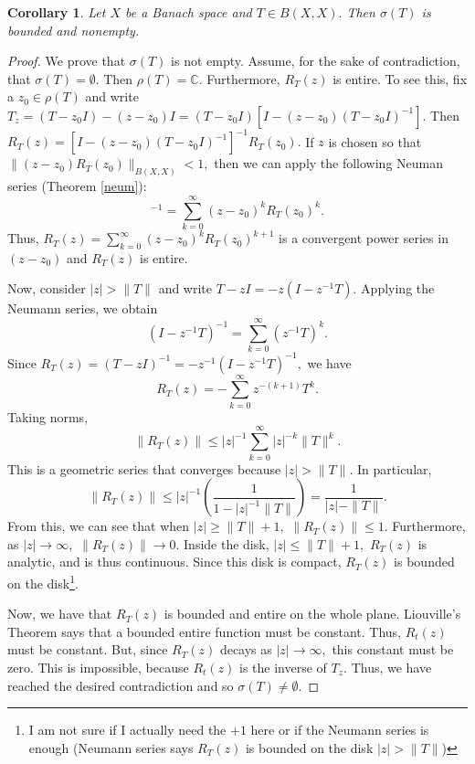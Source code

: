 \documentclass[12pt,a4paper]{article}
\theoremstyle{boldthm}
\newtheorem{corollary}[theorem]{Corollary}
\theoremstyle{bolddefn}
\begin{document}
\begin{corollary}
    Let $X$ be a Banach space and $T \in B(X, X).$ Then $\sigma(T)$ is bounded and nonempty. 
\end{corollary}
\begin{proof}
We prove that $\sigma(T)$ is not empty.
Assume, for the sake of contradiction, that $\sigma(T) = \emptyset.$ Then $\rho(T) = \mathbb{C}.$ Furthermore, $R_T(z)$ is entire. To see this, fix a $z_0 \in \rho(T)$ and write $T_z = (T-z_0 I) - (z-z_0)I = (T-z_0I) [ I - (z-z_0)(T-z_0I)^{-1}].$ Then $R_T(z) = [ I - (z-z_0)(T-z_0I)^{-1}]^{-1} R_T(z_0).$ If $z$ is chosen so that $\| (z-z_0) R_T(z_0) \|_{B(X, X)} < 1,$ then we can apply the following Neuman series (Theorem \ref{neum}):
\begin{equation}
    [ I - (z-z_0)(T-z_0I)^{-1}]^{-1} = \sum_{k=0}^{\infty} (z-z_0)^k R_T(z_0)^k.
\end{equation}
Thus, $R_T(z) = \sum_{k=0}^{\infty} (z-z_0)^k R_T(z_0)^{k+1}$ is a convergent power series in $(z-z_0)$ and $R_T(z)$ is entire. 


Now, consider $|z| > \| T \|$ and write $T-zI = -z (I - z^{-1} T).$ Applying the Neumann series, we obtain
\begin{equation}
    (I - z^{-1} T)^{-1} = \sum_{k=0}^{\infty} (z^{-1} T)^k.
\end{equation}
Since $R_T(z) = (T-zI)^{-1} = -z^{-1}(I - z^{-1} T)^{-1},$ we have
\begin{equation}
    R_T(z) = - \sum_{k=0}^{\infty} z^{-(k+1)} T^k.
\end{equation}
Taking norms, 
\begin{equation}
    \| R_T(z) \| \le |z|^{-1} \sum_{k=0}^{\infty} |z|^{-k} \|T\|^k.
\end{equation}
This is a geometric series that converges because $|z|>\|T\|.$ In particular,
\begin{equation}
    \| R_T(z) \| \le |z|^{-1} \left(\frac{1}{1 - |z|^{-1} \|T\|}\right) = \frac{1}{|z| - \|T\|}.
\end{equation}
From this, we can see that when $|z| \ge \|T\| + 1,$ $\|R_T(z)\| \le 1.$ Furthermore, as $|z| \rightarrow \infty,$ $\|R_T(z)\| \rightarrow 0.$ Inside the disk, $|z| \le \|T\| + 1,$ $R_T(z)$ is analytic, and is thus continuous. Since this disk is compact, $R_T(z)$ is bounded on the disk\footnote{I am not sure if I actually need the $+1$ here or if the Neumann series is enough (Neumann series says $R_T(z)$ is bounded on the disk $|z| > \|T\|$)}. 

Now, we have that $R_T(z)$ is bounded and entire on the whole plane. Liouville's Theorem says that a bounded entire function must be constant. Thus, $R_t(z)$ must be constant. But, since $R_T(z)$ decays as $|z| \rightarrow \infty,$ this constant must be zero. This is impossible, because $R_t(z)$ is the inverse of $T_z.$ Thus, we have reached the desired contradiction and so $\sigma(T) \ne \emptyset.$



\end{proof}
\end{document}
